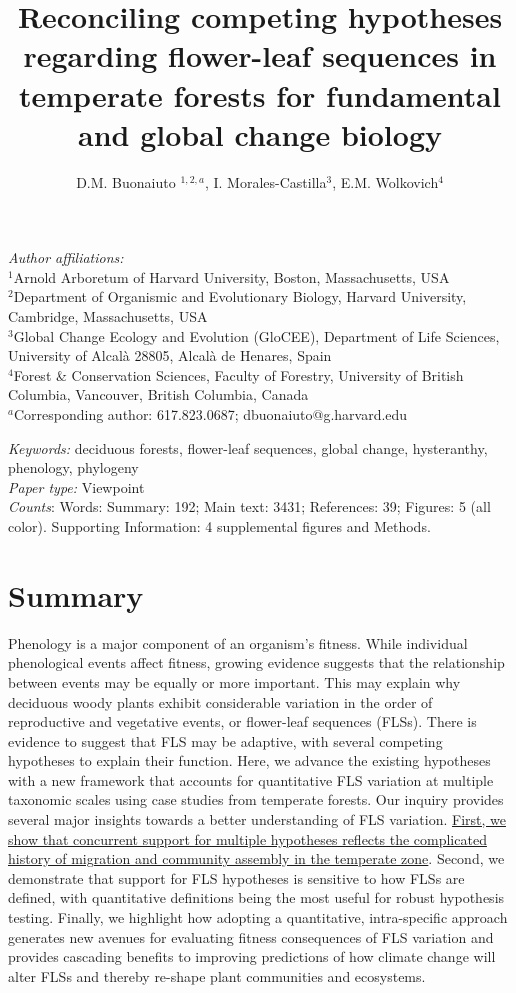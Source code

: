 \documentclass[11pt]{article}
\title{Reconciling competing hypotheses regarding flower-leaf sequences in temperate forests for fundamental and global change biology}
\date{}
\author{D.M. Buonaiuto $^{1,2,a}$, I. Morales-Castilla$^{3}$, E.M. Wolkovich$^{4}$}
\begin{document}
\maketitle
\linenumbers
\noindent \emph{Author affiliations:}\\
\noindent $^1$Arnold Arboretum of Harvard University, Boston, Massachusetts, USA\\
$^2$Department of Organismic and Evolutionary Biology, Harvard University, Cambridge, Massachusetts, USA\\
$^3$Global Change Ecology and Evolution (GloCEE), Department of Life Sciences, University of Alcal\`a  28805, Alcal\`a de Henares, Spain\\
$^4$Forest \& Conservation Sciences, Faculty of Forestry, University of British Columbia, Vancouver, British Columbia, Canada\\
$^a$Corresponding author: 617.823.0687; dbuonaiuto@g.harvard.edu

\noindent \emph{Keywords:} deciduous forests, flower-leaf sequences, global change, hysteranthy, phenology, phylogeny \\ %
\emph{Paper type:} Viewpoint\\
 \emph{Counts}: Words: Summary: 192; Main text: 3431; References: 39;  Figures: 5 (all color). Supporting Information: 4 supplemental figures and Methods.
\newpage

\section*{Summary}
Phenology is a major component of an organism's fitness. While individual phenological events affect fitness, growing evidence suggests that the relationship between events may be equally or more important. This may explain why deciduous woody plants exhibit considerable variation in the order of reproductive and vegetative events, or flower-leaf sequences (FLSs). There is evidence to suggest that FLS may be adaptive, with several competing hypotheses to explain their function. Here, we advance the existing hypotheses with a new framework that accounts for quantitative FLS variation at multiple taxonomic scales using case studies from temperate forests. Our inquiry provides several major insights towards a better understanding of FLS variation. \underline{First, we show that concurrent support for multiple hypotheses reflects the complicated history of migration and community assembly in the temperate zone}. Second, we demonstrate that support for FLS hypotheses is sensitive to how FLSs are defined, with quantitative definitions being the most useful for robust hypothesis testing. Finally, we highlight how adopting a quantitative, intra-specific approach generates new avenues for evaluating fitness consequences of FLS variation and provides cascading benefits to improving predictions of how climate change will alter FLSs and thereby re-shape plant communities and ecosystems.
\end{document}
